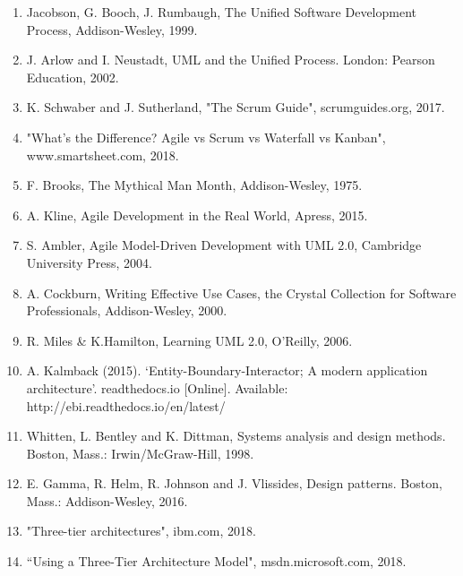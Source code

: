 \documentclass[fontsize=11pt]{extarticle}
\numberwithin{figure}{section} %
\numberwithin{table}{section}%
\begin{document}
\begin{enumerate}
  \item Jacobson, G. Booch, J. Rumbaugh, The Unified Software Development Process, Addison-Wesley, 1999.
  \item J. Arlow and I. Neustadt, UML and the Unified Process. London: Pearson Education, 2002.
  \item K. Schwaber and J. Sutherland, "The Scrum Guide", scrumguides.org, 2017. 
  \item "What's the Difference? Agile vs Scrum vs Waterfall vs Kanban", www.smartsheet.com, 2018. 
  \item F. Brooks, The Mythical Man Month, Addison-Wesley, 1975.
  \item A. Kline, Agile Development in the Real World, Apress, 2015.  
  \item S. Ambler, Agile Model-Driven Development with UML 2.0, Cambridge University Press, 2004.
  \item A. Cockburn, Writing Effective Use Cases, the Crystal Collection for Software Professionals, Addison-Wesley, 2000.
  \item R. Miles & K.Hamilton, Learning UML 2.0, O’Reilly, 2006.
  \item A. Kalmback (2015). ‘Entity-Boundary-Interactor; A modern application architecture’. readthedocs.io [Online]. Available: http://ebi.readthedocs.io/en/latest/
  \item Whitten, L. Bentley and K. Dittman, Systems analysis and design methods. Boston, Mass.: Irwin/McGraw-Hill, 1998.
  \item E. Gamma, R. Helm, R. Johnson and J. Vlissides, Design patterns. Boston, Mass.: Addison-Wesley, 2016.
  \item "Three-tier architectures", ibm.com, 2018.
  \item “Using a Three-Tier Architecture Model", msdn.microsoft.com, 2018. 
\end{enumerate}
\newpage

% 
\end{document}
